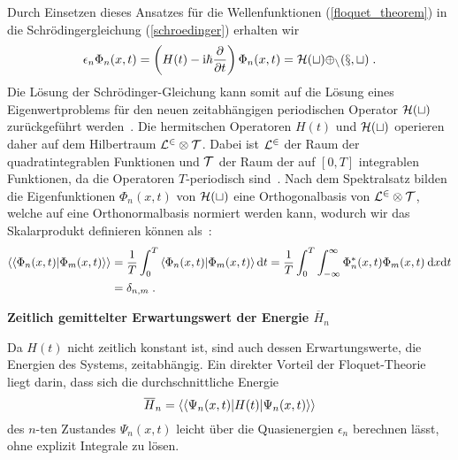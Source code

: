   Durch Einsetzen dieses Ansatzes für die Wellenfunktionen (\ref{floquet_theorem}) in die Schrödingergleichung (\ref{schroedinger}) erhalten wir
  \begin{equation}
    \epsilon_n \Phi_n(x,t) = \left(H(t)-\text{i}\hbar\frac{\partial}{\partial t}\right)\Phi_n(x,t) = \cal{H}(t) \Phi_n(x,t) \; .
    \label{eigenwertproblem}
  \end{equation}
  Die Lösung der Schrödinger-Gleichung kann somit auf die Lösung eines Eigenwertproblems für den neuen zeitabhängigen periodischen Operator $\cal{H}(t)$ zurückgeführt werden~\cite{sherly}.
  Die hermitschen Operatoren $H(t)$ und $\cal H(t)$ operieren daher auf dem Hilbertraum $\cal{L}^2 \otimes \cal{T}$.
  Dabei ist $\cal{L}^2$ der Raum der quadratintegrablen Funktionen und $\cal{T}$ der Raum der auf $[0,T]$ integrablen Funktionen, da die Operatoren $T$-periodisch sind~\cite{haengi}.
  Nach dem Spektralsatz bilden die Eigenfunktionen $\Phi_n(x,t)$ von $\cal{H}(t)$ eine Orthogonalbasis von $\cal{L}^2 \otimes \cal{T}$, welche auf eine Orthonormalbasis normiert werden kann, wodurch wir das Skalarprodukt definieren können als~\cite{haengi}:
  \begin{align}
    \braket{\braket{\Phi_n(x,t)|\Phi_m(x,t)}} &= \frac{1}{T} \int_0^T \braket{\Phi_n(x,t)|\Phi_m(x,t)} \text{d}t %
    = \frac{1}{T} \int_0^T \int_{-\infty}^{\infty} \Phi_n^*(x,t)\Phi_m(x,t) \: \text{d}x\text{d}t \notag\\
    &= \delta_{n,m} \; .
    \label{skalarprodukt_einzelner}
  \end{align}

\textbf{Zeitlich gemittelter Erwartungswert der Energie $\overline{H}_n$}

    Da $H(t)$ nicht zeitlich konstant ist, sind auch dessen Erwartungswerte, die Energien des Systems, zeitabhängig.
    Ein direkter Vorteil der Floquet-Theorie liegt darin, dass sich die durchschnittliche Energie
    \begin{equation}
      \overline{H}_n  = \braket{\braket{\Psi_n(x,t)|H(t)|\Psi_n(x,t)}}
    \end{equation}
    des $n$-ten Zustandes $\Psi_n(x,t)$ leicht über die Quasienergien $\epsilon_n$ berechnen lässt, ohne explizit Integrale zu lösen.

